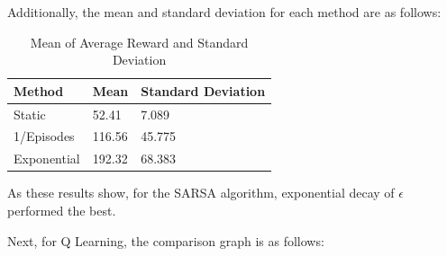 Additionally, the mean and standard deviation for each method are as follows:

\begin{table}[H]
    \begin{tabular}{lll}
    \hline
    Method      & Mean   & Standard Deviation \\ \hline
    Static      & 52.41  & 7.089              \\
    1/Episodes  & 116.56  & 45.775             \\
    Exponential & 192.32 & 68.383             \\ \hline
    \end{tabular}
    \caption{Mean of Average Reward and Standard Deviation}
\end{table}

As these results show, for the SARSA algorithm, exponential decay of $\epsilon$ performed the best.

Next, for Q Learning, the comparison graph is as follows:




